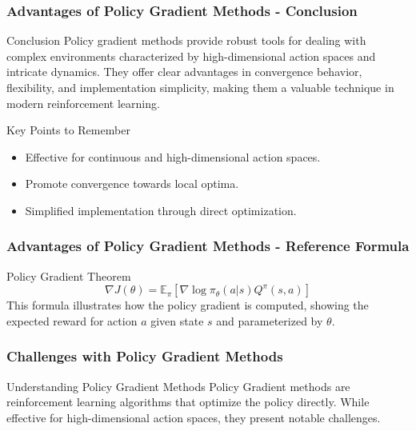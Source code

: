 \documentclass[aspectratio=169]{beamer}
\begin{document}
\begin{frame}[fragile]
    \frametitle{Advantages of Policy Gradient Methods - Conclusion}
    \begin{block}{Conclusion}
        Policy gradient methods provide robust tools for dealing with complex environments characterized by high-dimensional action spaces and intricate dynamics. They offer clear advantages in convergence behavior, flexibility, and implementation simplicity, making them a valuable technique in modern reinforcement learning.
    \end{block}

    \begin{block}{Key Points to Remember}
        \begin{itemize}
            \item Effective for continuous and high-dimensional action spaces.
            \item Promote convergence towards local optima.
            \item Simplified implementation through direct optimization.
        \end{itemize}
    \end{block}
\end{frame}

\begin{frame}[fragile]
    \frametitle{Advantages of Policy Gradient Methods - Reference Formula}
    \begin{block}{Policy Gradient Theorem}
        \begin{equation}
            \nabla J(\theta) = \mathbb{E}_\pi \left[ \nabla \log \pi_\theta(a|s) Q^\pi(s, a) \right]
        \end{equation}
        This formula illustrates how the policy gradient is computed, showing the expected reward for action \(a\) given state \(s\) and parameterized by \(\theta\).
    \end{block}
\end{frame}

\begin{frame}[fragile]
    \frametitle{Challenges with Policy Gradient Methods}
    \begin{block}{Understanding Policy Gradient Methods}
        Policy Gradient methods are reinforcement learning algorithms that optimize the policy directly. While effective for high-dimensional action spaces, they present notable challenges.
    \end{block}
\end{frame}
\end{document}
